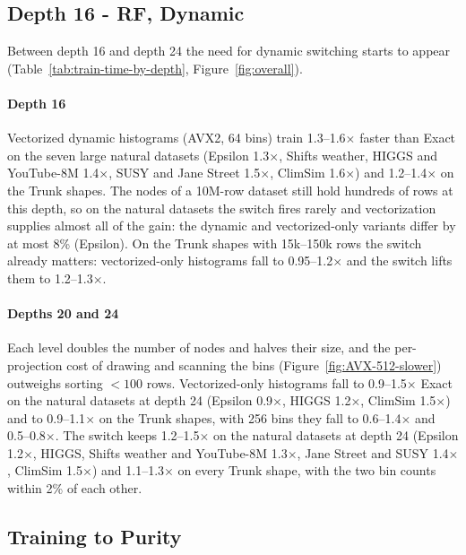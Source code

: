 \documentclass[sigconf]{acmart}%
\begin{document}
\subsection{Depth 16 - RF, Dynamic}
\label{sec:res-depth16}

Between depth 16 and depth 24 the need for dynamic switching starts to appear (Table~\ref{tab:train-time-by-depth}, Figure~\ref{fig:overall}).

\paragraph{Depth 16} Vectorized dynamic histograms (AVX2, 64 bins) train 1.3--1.6$\times$ faster than Exact on the seven large natural datasets (Epsilon 1.3$\times$, Shifts weather, HIGGS and YouTube-8M 1.4$\times$, SUSY and Jane Street 1.5$\times$, ClimSim 1.6$\times$) and 1.2--1.4$\times$ on the Trunk shapes. The nodes of a 10M-row dataset still hold hundreds of rows at this depth, so on the natural datasets the switch fires rarely and vectorization supplies almost all of the gain: the dynamic and vectorized-only variants differ by at most 8\% (Epsilon). On the Trunk shapes with 15k--150k rows the switch already matters: vectorized-only histograms fall to 0.95--1.2$\times$ and the switch lifts them to 1.2--1.3$\times$.

\paragraph{Depths 20 and 24} Each level doubles the number of nodes and halves their size, and the per-projection cost of drawing and scanning the bins (Figure~\ref{fig:AVX-512-slower}) outweighs sorting $<100$ rows. Vectorized-only histograms fall to 0.9--1.5$\times$ Exact on the natural datasets at depth 24 (Epsilon 0.9$\times$, HIGGS 1.2$\times$, ClimSim 1.5$\times$) and to 0.9--1.1$\times$ on the Trunk shapes, with 256 bins they fall to 0.6--1.4$\times$ and 0.5--0.8$\times$. The switch keeps 1.2--1.5$\times$ on the natural datasets at depth 24 (Epsilon 1.2$\times$, HIGGS, Shifts weather and YouTube-8M 1.3$\times$, Jane Street and SUSY 1.4$\times$, ClimSim 1.5$\times$) and 1.1--1.3$\times$ on every Trunk shape, with the two bin counts within 2\% of each other.

\subsection{Training to Purity}
\label{sec:res-purity}
\end{document}
